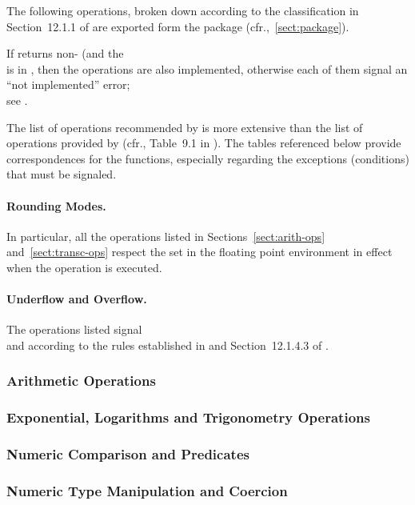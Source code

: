 \documentclass[../Floating-Point-Operations.tex]{subfiles}
\begin{document}
The following \CL{} operations, broken down according to the
classification in Section~12.1.1 of \cite{1996:ANSIHyperSpec} are exported
form the  package
(cfr.,~\ref{sect:package}).

If  returns non-
(and the\\
 is in
, then the operations are also implemented, otherwise
each of them signal an ``not implemented'' error;\\
see .

The list of operations
recommended by \cite{2008:IEEE-754} is more extensive than the list of
operations provided by \CL{} (cfr., Table~9.1 in \cite{2008:IEEE-754}).
%
The tables referenced below provide correspondences for the \CL{} functions,
especially regarding the exceptions (conditions) that must be
signaled.

\paragraph{Rounding Modes.} In particular, all the operations listed
in Sections~\ref{sect:arith-ops} and~\ref{sect:transc-ops} respect the
 set in the floating point
environment in effect when the operation is executed.

\paragraph{Underflow and Overflow.}  The operations listed signal
\\ and
 according to the rules established
in \cite{2008:IEEE-754} and Section~12.1.4.3 of \cite{1996:ANSIHyperSpec}.


\subsubsection{Arithmetic Operations}

\newpage

\subsubsection{Exponential, Logarithms and Trigonometry Operations}

\newpage

\subsubsection{Numeric Comparison and Predicates}


\subsubsection{Numeric Type Manipulation and Coercion}

\end{document}

